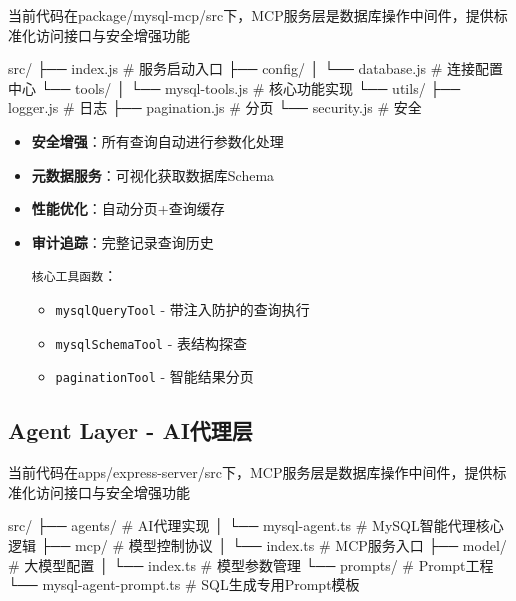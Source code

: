 \documentclass{article}
\begin{document}
	当前代码在package/mysql-mcp/src下，MCP服务层是数据库操作中间件，提供标准化访问接口与安全增强功能
	
	\begin{filetree}
        src/
        ├── index.js        # 服务启动入口
        ├── config/
        │   └── database.js # 连接配置中心
        └── tools/
        │   └── mysql-tools.js # 核心功能实现
        └── utils/
            ├── logger.js   # 日志
            ├── pagination.js  # 分页
            └── security.js # 安全
	\end{filetree}
	
	\begin{tcolorbox}[
		title=关键能力,
		colback=white,
		colframe=blue!50,
		fonttitle=\bfseries,
		coltitle=black,
		breakable
		]
		\begin{itemize}
			\item[\textcolor{filecolor}{\textbullet}] \textbf{安全增强}：所有查询自动进行参数化处理
			\item[\textcolor{filecolor}{\textbullet}] \textbf{元数据服务}：可视化获取数据库Schema
			\item[\textcolor{filecolor}{\textbullet}] \textbf{性能优化}：自动分页+查询缓存
			\item[\textcolor{filecolor}{\textbullet}] \textbf{审计追踪}：完整记录查询历史
			
			\medskip
			\textcolor{funccolor}{\texttt{核心工具函数}}：
			\begin{itemize}
				\item \texttt{mysqlQueryTool} - 带注入防护的查询执行
				\item \texttt{mysqlSchemaTool} - 表结构探查
				\item \texttt{paginationTool} - 智能结果分页
			\end{itemize}
		\end{itemize}
	\end{tcolorbox}
	
	\subsection{Agent Layer - AI代理层}
	
	当前代码在apps/express-server/src下，MCP服务层是数据库操作中间件，提供标准化访问接口与安全增强功能
	
	\begin{filetree}
        src/
        ├── agents/                  # AI代理实现
        │   └── mysql-agent.ts       # MySQL智能代理核心逻辑
        ├── mcp/                     # 模型控制协议
        │   └── index.ts             # MCP服务入口
        ├── model/                   # 大模型配置
        │   └── index.ts             # 模型参数管理
        └── prompts/                 # Prompt工程
        └── mysql-agent-prompt.ts # SQL生成专用Prompt模板
	\end{filetree}
	
\end{document}
